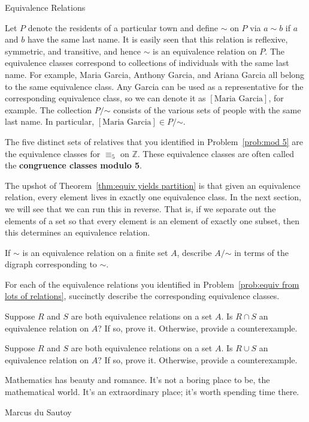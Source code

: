 \begin{section}{Equivalence Relations}
\begin{example}\label{ex:last name}
Let $P$ denote the residents of a particular town and define $\sim$ on $P$ via $a\sim b$ if $a$ and $b$ have the same last name. It is easily seen that this relation is reflexive, symmetric, and transitive, and hence $\sim$ is an equivalence relation on $P$.  The equivalence classes correspond to collections of individuals with the same last name.  For example, Maria Garcia, Anthony Garcia, and Ariana Garcia all belong to the same equivalence class.  Any Garcia can be used as a representative for the corresponding equivalence class, so we can denote it as $[\text{Maria Garcia}]$, for example. The collection $P/\mathord\sim$ consists of the various sets of people with the same last name.  In particular, $[\text{Maria Garcia}]\in P/\mathord\sim$.
\end{example}

\begin{example}
The five distinct sets of relatives that you identified in Problem~\ref{prob:mod 5} are the equivalence classes for $\equiv_5$ on $\mathbb{Z}$. These equivalence classes are often called the \textbf{congruence classes modulo 5}.
\end{example}

The upshot of Theorem~\ref{thm:equiv yields partition} is that given an equivalence relation, every element lives in exactly one equivalence class.  In the next section, we will see that we can run this in reverse.  That is, if we separate out the elements of a set so that every element is an element of exactly one subset, then this determines an equivalence relation.

\begin{problem}
If $\sim$ is an equivalence relation on a finite set $A$, describe $A/\mathord\sim$ in terms of the digraph corresponding to $\sim$.
\end{problem}

\begin{problem}
For each of the equivalence relations you identified in Problem~\ref{prob:equiv from lots of relations}, succinctly describe the corresponding equivalence classes.
\end{problem}

\begin{problem}
Suppose $R$ and $S$ are both equivalence relations on a set $A$. Is $R\cap S$ an equivalence relation on $A$? If so, prove it.  Otherwise, provide a counterexample.
\end{problem}

\begin{problem}
Suppose $R$ and $S$ are both equivalence relations on a set $A$. Is $R\cup S$ an equivalence relation on $A$? If so, prove it.  Otherwise, provide a counterexample.
\end{problem}

\epigraph{Mathematics has beauty and romance. It's not a boring place to be, the mathematical world. It's an extraordinary place; it's worth spending time there.}{Marcus du Sautoy}

\end{section}